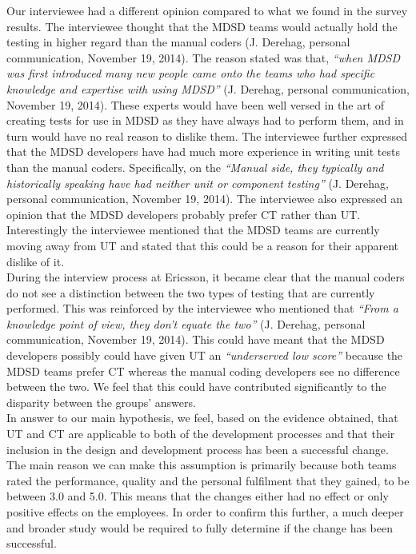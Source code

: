 \documentclass[final_report_innit.tex]{subfiles}
\begin{document}
Our interviewee had a different opinion compared to what we found in the survey results. The interviewee thought that the MDSD teams would actually hold the testing in higher regard than the manual coders (J. Derehag, personal communication, November 19, 2014). The reason stated was that, \textit{``when MDSD was first introduced many new people came onto the teams who had specific knowledge and expertise with using MDSD''} (J. Derehag, personal communication, November 19, 2014). These experts would have been well versed in the art of creating tests for use in MDSD as they have always had to perform them, and in turn would have no real reason to dislike them. The interviewee further expressed that the MDSD developers have had much more experience in writing unit tests than the manual coders. Specifically, on the \textit{``Manual side, they typically and historically speaking have had neither unit or component testing''} (J. Derehag, personal communication, November 19, 2014). The interviewee also expressed an opinion that the MDSD developers probably prefer CT rather than UT. Interestingly the interviewee mentioned that the MDSD teams are currently moving away from UT and stated that this could be a reason for their apparent dislike of it.
\\

During the interview process at Ericsson, it became clear that the manual coders do not see a distinction between the two types of
testing that are currently performed. This was reinforced by the interviewee who mentioned that \textit{``From a knowledge point of view, they don't equate the two''} (J. Derehag, personal communication, November 19, 2014). This could have meant that the MDSD developers possibly could have given UT an \textit{``underserved low score''} because the MDSD teams prefer CT whereas the manual coding developers see no difference between the two. We feel that this could have contributed significantly to the disparity between the groups' answers.
\\

In answer to our main hypothesis, we feel, based on the evidence obtained, that UT and CT are applicable to both of the development processes and that their inclusion in the design and development process has been a successful change. The main reason we can make this assumption is primarily because both teams rated the performance, quality and the personal fulfilment that they gained, to be between 3.0 and 5.0. This means that the changes either had no effect or only positive effects on the employees. In order to confirm this further, a much deeper and broader study would be required to fully determine if the change has been successful.
\end{document}
